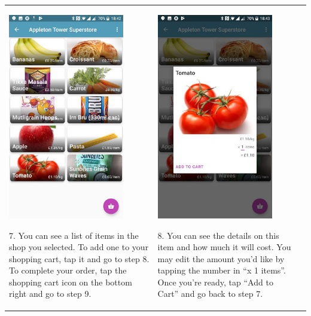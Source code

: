 \documentclass[onecolumn]{IEEEtran}
\begin{document}
\begin{table}[H]
  \centering
  \begin{tabular}{ | m{5.5cm} | m{5.5cm} | m{5.5cm} | }
    \hline
    \begin{minipage}{.31\textwidth}
      \includegraphics[width=\linewidth, height=90mm]{seven.jpg}
    \end{minipage}
    7. You can see a list of items in the shop you selected. To add one to your shopping cart, tap it and go to step 8. To complete your order, tap the shopping cart icon on the bottom right and go to step 9.
    &
    \begin{minipage}{.31\textwidth}
      \includegraphics[width=\linewidth, height=90mm]{eight.jpg}
    \end{minipage}
    8. You can see the details on this item and how much it will cost. You may edit the amount you’d like by tapping the number in “x 1 items”. Once you’re ready, tap “Add to Cart” and go back to step 7.

\end{tabular}
\end{table}
\end{document}
